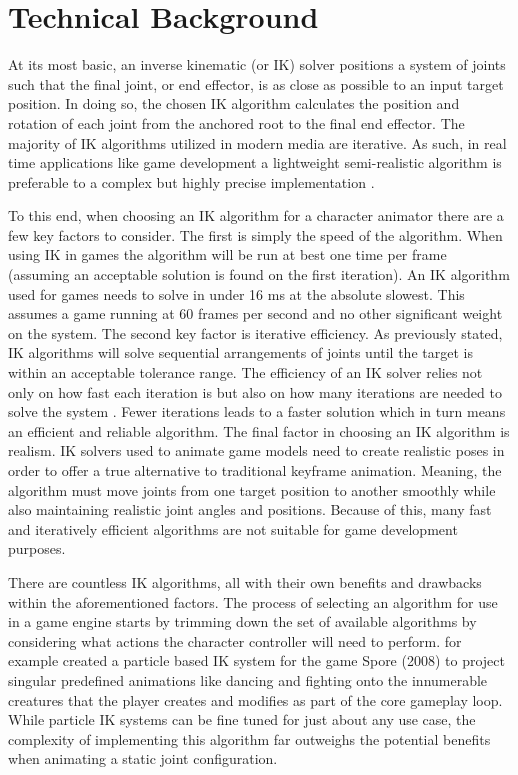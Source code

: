 \documentclass[10pt,twocolumn]{article}
\begin{document}
\section{Technical Background}
At its most basic, an inverse kinematic (or IK) solver positions a system of joints such that the final joint, or end effector, is as close as possible to an input target position. In doing so, the chosen IK algorithm calculates the position and rotation of each joint from the anchored root to the final end effector. The majority of IK algorithms utilized in modern media are iterative. As such, in real time applications like game development a lightweight semi-realistic algorithm is preferable to a complex but highly precise implementation \cite{litReview}\cite{ZucconiIK}.

To this end, when choosing an IK algorithm for a character animator there are a few key factors to consider. The first is simply the speed of the algorithm. When using IK in games the algorithm will be run at best one time per frame (assuming an acceptable solution is found on the first iteration). An IK algorithm used for games needs to solve in under 16 ms at the absolute slowest. This assumes a game running at 60 frames per second and no other significant weight on the system. The second key factor is iterative efficiency. As previously stated, IK algorithms will solve sequential arrangements of joints until the target is within an acceptable tolerance range. The efficiency of an IK solver relies not only on how fast each iteration is but also on how many iterations are needed to solve the system \cite{litReview}\cite{baseFABRIK}. Fewer iterations leads to a faster solution which in turn means an efficient and reliable algorithm. The final factor in choosing an IK algorithm is realism. IK solvers used to animate game models need to create realistic poses in order to offer a true alternative to traditional keyframe animation. Meaning, the algorithm must move joints from one target position to another smoothly while also maintaining realistic joint angles and positions. Because of this, many fast and iteratively efficient algorithms are not suitable for game development purposes. 

There are countless IK algorithms, all with their own benefits and drawbacks within the aforementioned factors. The process of selecting an algorithm for use in a game engine starts by trimming down the set of available algorithms by considering what actions the character controller will need to perform. \textcite{spore} for example created a particle based IK system for the game Spore (2008) to project singular predefined animations like dancing and fighting onto the innumerable creatures that the player creates and modifies as part of the core gameplay loop. While particle IK systems can be fine tuned for just about any use case, the complexity of implementing this algorithm far outweighs the potential benefits when animating a static joint configuration. 
\end{document}
